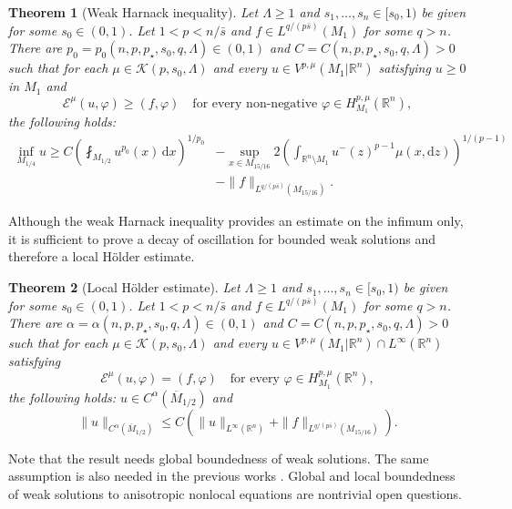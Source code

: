 \documentclass[11pt]{amsart}
\theoremstyle{plain}
\newtheorem{theorem}{Theorem}[section]
\theoremstyle{definition}
\numberwithin{equation}{section}
\newcommand{\R}{\mathbb{R}}
\newcommand{\cE}{\mathcal{E}}
\newcommand{\cK}{\mathcal{K}}
\begin{document}
\begin{theorem}[Weak Harnack inequality]\label{thm:weak_Harnack}
Let $\Lambda \ge 1$ and $s_1,\dots,s_n\in[s_0,1)$ be given for some $s_0\in(0,1)$. Let $1<p< n/\bar{s}$ and $f\in L^{q/(p\bar{s})}(M_1)$ for some $q>n$.
There are $p_0 = p_0(n,p,p_{\star},s_0,q,\Lambda)\in(0,1)$ and $C = C(n,p,p_{\star},s_0,q,\Lambda) > 0$ such that for each $\mu\in\cK(p,s_0,\Lambda)$ and every $u\in V^{p,\mu}(M_1|\R^n)$ satisfying $u\geq 0$ in $M_1$ and
\[ \cE^{\mu}(u,\varphi) \geq  (f,\varphi) \quad \text{for every non-negative } \varphi\in H^{p,\mu}_{M_1}(\R^n),\]
the following holds:
\begin{equation}\label{eq:thm:weakHarnack}
\begin{aligned}
\inf_{M_{1/4}} u \geq C \left( \fint_{M_{1/2}} u^{p_0}(x) \,\mathrm{d}x \right)^{1/p_0} &- \sup_{x \in M_{15/16}} 2 \left( \int_{\mathbb{R}^n \setminus M_1} u^-(z)^{p-1} \mu(x, \mathrm{d}z) \right)^{1/(p-1)} \\
& - \|f\|_{L^{q/(p\bar{s})}(M_{15/16})}.
\end{aligned}
\end{equation}
\end{theorem}
Although the weak Harnack inequality provides an estimate on the infimum only, it is sufficient to prove a decay of oscillation for bounded weak solutions and therefore a local H\"older estimate.
\begin{theorem}[Local H\"older estimate]\label{thm:Holder}
Let $\Lambda \ge 1$ and $s_1,\dots,s_n\in[s_0,1)$ be given for some $s_0\in(0,1)$. Let $1<p< n/\bar{s}$ and $f\in L^{q/(p\bar{s})}(M_1)$ for some $q>n$.
There are $\alpha = \alpha(n,p,p_{\star},s_0,q,\Lambda)\in(0,1)$ and $C = C(n,p,p_{\star},s_0,q,\Lambda) > 0$ such that for each $\mu\in\cK(p,s_0,\Lambda)$ and every $u\in V^{p,\mu}(M_1|\R^n)\cap L^{\infty}(\R^n)$ satisfying
\[ \cE^{\mu}(u,\varphi) =  (f,\varphi) \quad \text{for every } \varphi\in H^{p,\mu}_{M_1}(\R^n),\]
the following holds: $u\in C^{\alpha}(\overline{M}_{1/2})$ and 
\begin{equation*}
\|u\|_{C^\alpha(\overline{M}_{1/2})} \leq C\left( \|u\|_{L^{\infty}(\R^n)} + \|f\|_{L^{q/(p\bar{s})}(M_{15/16})} \right).
\end{equation*}
\end{theorem}
Note that the result needs global boundedness of weak solutions. The same assumption is also needed in the previous works \cite{CKW19, DK20, CK20}.
Global and local boundedness of weak solutions to anisotropic nonlocal equations are nontrivial open questions. 
\end{document}
